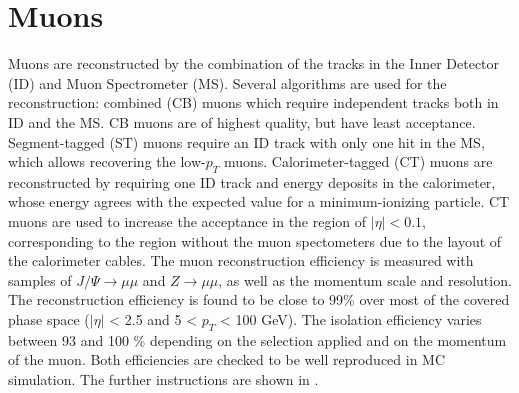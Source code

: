 \section{Muons}
Muons are reconstructed by the combination of the tracks in the Inner Detector (ID) and Muon Spectrometer (MS). 
Several algorithms are used for the reconstruction: 
combined (CB) muons which require independent tracks both in ID and the MS. CB muons are of highest quality, but have least acceptance. 
Segment-tagged (ST) muons require an ID track with only one hit in the MS, which allows recovering the low-$p_T$ muons. 
Calorimeter-tagged (CT) muons are reconstructed by requiring one ID track and energy deposits in the calorimeter, whose energy agrees with the expected value for a minimum-ionizing particle. CT muons are used to increase the acceptance in the region of $|\eta| < 0.1$, corresponding to the region without the muon spectometers due to the layout of the calorimeter cables. 
The muon reconstruction efficiency is measured with samples of $J/\Psi \rightarrow \mu\mu$ and $Z\rightarrow \mu\mu$, as well as the momentum scale and resolution.
The reconstruction efficiency is found to be close to 99\% over most of the covered phase space ($|\eta|$ < 2.5 and 5 < $p_{T}$ < 100 GeV). The isolation efficiency varies between 93 and 100 \% depending on the selection applied and on the momentum of the muon. Both efficiencies are checked to be well reproduced in MC simulation. 
The further instructions are shown in \cite{MUON-2018-03}.
\begin{table}[ht]
 \caption{Summary of muon selection used in this analysis}
 \label{tab:muon_selection}
\end{table}
